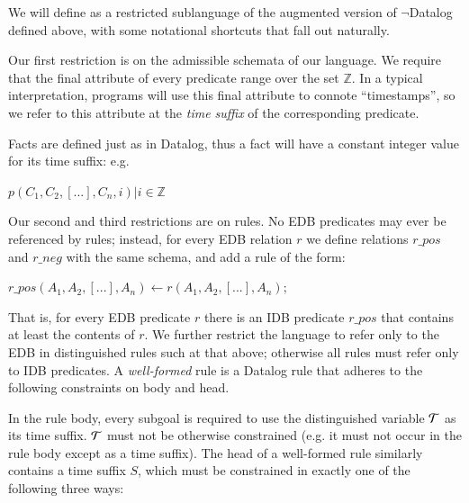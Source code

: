 We will define \dedalus as a restricted sublanguage of the augmented version of $\lnot$Datalog defined above, with some notational shortcuts that fall out naturally.

Our first restriction is on the admissible schemata of our language. We  require that the final attribute of every \dedalus predicate range over the set $\mathbb{Z}$.  In a typical interpretation, \dedalus programs will use this final attribute to connote ``timestamps'', so we refer to this attribute at the \emph{time suffix} of the corresponding predicate.  


Facts are defined just as in Datalog, thus a fact
will have a constant integer value for its time suffix: e.g.


$p(C_{1},C_{2},[...],C_{n}, i) |  i \in \mathbb{Z}$

Our second and third restrictions are on rules.  
No EDB predicates may ever be referenced by rules; instead, for every EDB relation $r$ we define relations $r\_pos$ 
and $r\_neg$ with the same schema, and add a rule of the form:

$r\_pos(A_1, A_2, [...], A_n) \leftarrow r(A_1, A_2, [...], A_n);$

That is, for every EDB predicate
$r$ there is an IDB predicate $r\_pos$ that contains at least the contents of $r$.  We further restrict the
language to refer only to the EDB in distinguished rules such at that above; otherwise all rules must refer 
only to IDB predicates.
A {\em well-formed }\dedalus rule is a Datalog rule that adheres to the following constraints on body and head.  

In the rule body, every
subgoal is required to use the distinguished variable $\Tau$ as its time suffix.  
$\Tau$ must not be otherwise
constrained (e.g. it must not occur in the rule body except as a time suffix).
The head of a well-formed rule similarly contains a time suffix $S$, which must
be constrained in exactly one of the following three ways:

